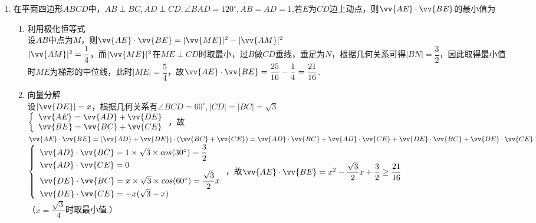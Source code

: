 \begin{enumerate}
\begin{enumerate}
        \item 在平面四边形$ABCD$中，$AB \perp BC, AD \perp CD, \angle BAD = 120^{\circ}, AB=AD=1$,若$E$为$CD$边上动点，则$\vv{AE} \cdot \vv{BE}$的最小值为
        \begin{jieda}
            \begin{enumerate}
                \item 利用极化恒等式 \\
                设$AB$中点为$M$，则$\vv{AE} \cdot \vv{BE} = |\vv{ME}|^2 - |\vv{AM}|^2$ \\
                $|\vv{AM}|^2 = \dfrac{1}{4}$，而$|\vv{ME}|^2$在$ME \perp CD$时取最小，过$B$做$CD$垂线，垂足为$N$，根据几何关系可得$|BN| = \dfrac{3}{2}$，因此取得最小值时$ME$为梯形的中位线，此时$|ME| = \dfrac{5}{4}$，故$\vv{AE} \cdot \vv{BE} = \dfrac{25}{16} - \dfrac{1}{4} = \dfrac{21}{16}$.
                \item 向量分解 \\
                设$|\vv{DE}| = x$，根据几何关系有$\angle BCD = 60^{\circ}, |CD| = |BC| = \sqrt{3}$\\
                $\left \{ \begin{array}{l}
                     \vv{AE} = \vv{AD} + \vv{DE}  \\
                     \vv{BE} = \vv{BC} + \vv{CE}
                \end{array}\right.$，故$\vv{AE} \cdot \vv{BE} = (\vv{AD} + \vv{DE})\cdot(\vv{BC} + \vv{CE}) = \vv{AD} \cdot \vv{BC} + \vv{AD} \cdot \vv{CE} + \vv{DE} \cdot \vv{BC} + \vv{DE} \cdot \vv{CE}$ \\
                $\left \{ \begin{array}{l}
                     \vv{AD} \cdot \vv{BC} = 1 \times \sqrt{3} \times cos(30^{\circ}) = \dfrac{3}{2}   \\
                     \vv{AD} \cdot \vv{CE} = 0   \\
                     \vv{DE} \cdot \vv{BC} = x \times \sqrt{3} \times cos(60^{\circ}) = \dfrac{\sqrt{3}}{2}x  \\
                     \vv{DE} \cdot \vv{CE} = -x(\sqrt{3}-x)
                \end{array}\right.$，故$\vv{AE} \cdot \vv{BE} = x^2 - \dfrac{\sqrt{3}}{2}x + \dfrac{3}{2} \geq \dfrac{21}{16}$\\
                （$x = \dfrac{\sqrt{3}}{4}$时取最小值.）
            \end{enumerate}
        \end{jieda}
    \end{enumerate}


\end{enumerate}
